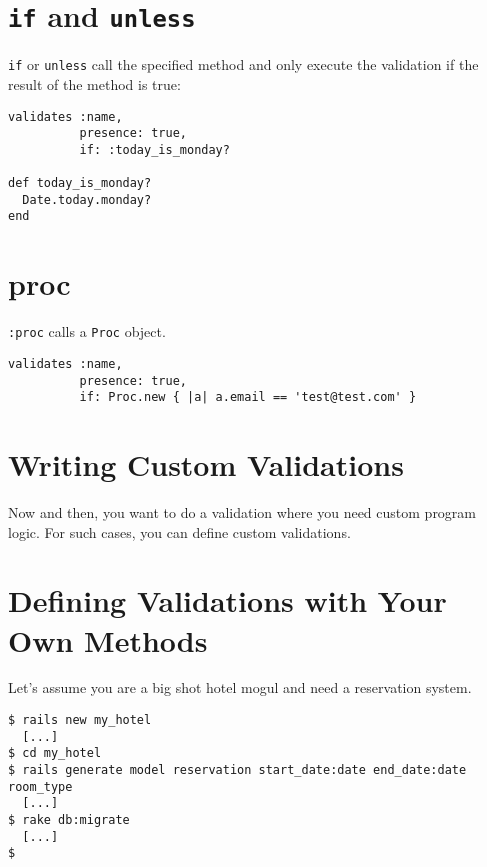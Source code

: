 \documentclass[a4paper]{book}
\begin{document}
\section{\texttt{if} and \texttt{unless}}\label{if-and-unless}

\texttt{if} or \texttt{unless} call the specified method and only execute the validation if the result of the method is true:

\begin{shaded}\begin{verbatim}
validates :name,
          presence: true,
          if: :today_is_monday?

def today_is_monday?
  Date.today.monday?
end
\end{verbatim}\end{shaded}

\section{proc}\label{proc}

\texttt{:}\texttt{proc} calls a \texttt{Proc} object.

\begin{shaded}\begin{verbatim}
validates :name,
          presence: true,
          if: Proc.new { |a| a.email == 'test@test.com' }
\end{verbatim}\end{shaded}

\section{Writing Custom Validations}\label{writing-custom-validations}

Now and then, you want to do a validation where you need custom program logic. For such cases, you can define custom validations.

\section{Defining Validations with Your Own Methods}\label{defining-validations-with-your-own-methods}

Let's assume you are a big shot hotel mogul and need a reservation system.

\begin{shaded}\begin{verbatim}
$ rails new my_hotel
  [...]
$ cd my_hotel
$ rails generate model reservation start_date:date end_date:date room_type
  [...]
$ rake db:migrate
  [...]
$
\end{verbatim}\end{shaded}
\end{document}
